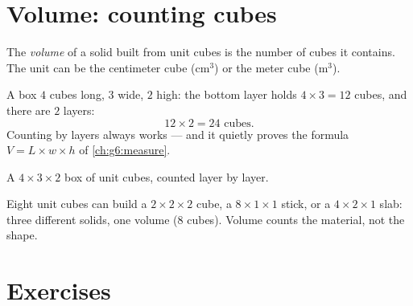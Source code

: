 \section{Volume: counting cubes}

\begin{definition}\label{def:g5:solids:volume}
The \emph{volume} of a solid built from unit cubes is
the number of cubes it contains. The unit can be the centimeter cube
(cm$^3$) or the meter cube (m$^3$).
\end{definition}

\begin{example}\label{ex:g5:solids:layers}
A box $4$ cubes long, $3$ wide, $2$ high: the bottom layer holds
$4 \times 3 = 12$ cubes, and there are $2$ layers:
\[
12 \times 2 = 24 \text{ cubes} .
\]
Counting by layers always works --- and it quietly proves the
formula $V = L \times w \times h$ of \cref{ch:g6:measure}.
\end{example}

\begin{omfigure}

{\small A $4 \times 3 \times 2$ box of unit cubes, counted layer by
layer.}
\end{omfigure}

\begin{example}\label{ex:g5:solids:rearrange}
Eight unit cubes can build a $2 \times 2 \times 2$ cube, a
$8 \times 1 \times 1$ stick, or a $4 \times 2 \times 1$ slab: three
different solids, one volume ($8$ cubes). Volume counts the
material, not the shape.
\end{example}

\section{Exercises}

